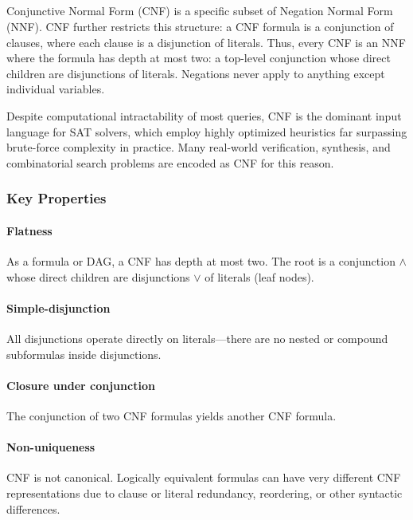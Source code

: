 \subsection{\color{blue}{CNF}}
Conjunctive Normal Form (CNF) is a specific subset of Negation Normal Form (NNF). CNF further restricts this structure: a CNF formula is a conjunction of clauses, where each clause is a disjunction of literals. Thus, every CNF is an NNF where the formula has depth at most two: a top-level conjunction whose direct children are disjunctions of literals. Negations never apply to anything except individual variables.

Despite computational intractability of most queries, CNF is the dominant input language for SAT solvers, which employ highly optimized heuristics far surpassing brute-force complexity in practice. Many real-world verification, synthesis, and combinatorial search problems are encoded as CNF for this reason.

\subsubsection{Key Properties}

\paragraph{Flatness}
As a formula or DAG, a CNF has depth at most two. The root is a conjunction $\wedge$ whose direct children are disjunctions $\vee$ of literals (leaf nodes).

\paragraph{Simple-disjunction}
All disjunctions operate directly on literals—there are no nested or compound subformulas inside disjunctions.

\paragraph{Closure under conjunction}
The conjunction of two CNF formulas yields another CNF formula.

\paragraph{Non-uniqueness}
CNF is not canonical. Logically equivalent formulas can have very different CNF representations due to clause or literal redundancy, reordering, or other syntactic differences.

